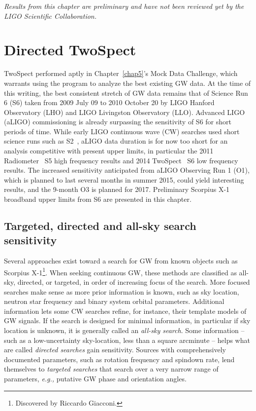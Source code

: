 
\textit{Results from this chapter are preliminary and have not been reviewed yet by the LIGO Scientific Collaboration.}

        \section{Directed TwoSpect}
        \label{directed}

TwoSpect performed aptly in Chapter~\ref{chap5}'s Mock Data Challenge, which warrants using the program to analyze the best existing GW data.
At the time of this writing, the best consistent stretch of GW data remains that of Science Run 6 (S6) taken from 2009 July 09 to 2010 October 20 by LIGO Hanford Observatory (LHO) and LIGO Livingston Observatory (LLO).
Advanced LIGO (aLIGO) commissioning is already surpassing the sensitivity of S6 for short periods of time.
While early LIGO continuous wave (CW) searches used short science runs such as S2~\cite{AbbottScoX12007}, aLIGO data duration is for now too short for an analysis competitive with present upper limits, in particular the 2011 Radiometer~\cite{AbadieStoch2011} S5 high frequency results and 2014 TwoSpect~\cite{GoetzTwoSpectResults2014} S6 low frequency results.
The increased sensitivity anticipated from aLIGO Observing Run 1 (O1), which is planned to last several months in summer 2015, could yield interesting results, and the 9-month O3 is planned for 2017.
Preliminary Scorpius X-1 broadband upper limits from S6 are presented in this chapter.


            \subsection{Targeted, directed and all-sky search sensitivity}
            \label{tradeoffs}

Several approaches exist toward a search for GW from known objects such as Scorpius X-1\footnote{Discovered by Riccardo Giacconi.}.
When seeking continuous GW, these methods are classified as all-sky, directed, or targeted, in order of increasing focus of the search.
More focused searches make sense as more prior information is known, such as sky location, neutron star frequency and binary system orbital parameters.
Additional information lets some CW searches refine, for instance, their template models of GW signals.
If the search is designed for minimal information, in particular if sky location is unknown, it is generally called an \textit{all-sky search}.
Some information -- such as a low-uncertainty sky-location, less than a square arcminute -- helps what are called \textit{directed searches} gain sensitivity.
Sources with comprehensively documented parameters, such as rotation frequency and spindown rate, lend themselves to \textit{targeted searches} that search over a very narrow range of parameters, \textit{e.g.,} putative GW phase and orientation angles.

